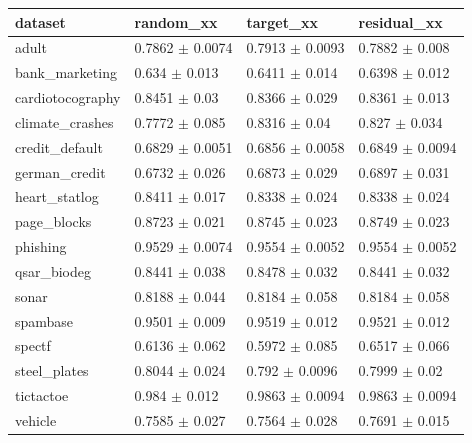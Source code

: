 \begin{tabular}{llll}
\toprule
dataset & random\_xx & target\_xx & residual\_xx \\
\midrule
adult & 0.7862 $\pm$ 0.0074 & 0.7913 $\pm$ 0.0093 & 0.7882 $\pm$ 0.008 \\
bank\_marketing & 0.634 $\pm$ 0.013 & 0.6411 $\pm$ 0.014 & 0.6398 $\pm$ 0.012 \\
cardiotocography & 0.8451 $\pm$ 0.03 & 0.8366 $\pm$ 0.029 & 0.8361 $\pm$ 0.013 \\
climate\_crashes & 0.7772 $\pm$ 0.085 & 0.8316 $\pm$ 0.04 & 0.827 $\pm$ 0.034 \\
credit\_default & 0.6829 $\pm$ 0.0051 & 0.6856 $\pm$ 0.0058 & 0.6849 $\pm$ 0.0094 \\
german\_credit & 0.6732 $\pm$ 0.026 & 0.6873 $\pm$ 0.029 & 0.6897 $\pm$ 0.031 \\
heart\_statlog & 0.8411 $\pm$ 0.017 & 0.8338 $\pm$ 0.024 & 0.8338 $\pm$ 0.024 \\
page\_blocks & 0.8723 $\pm$ 0.021 & 0.8745 $\pm$ 0.023 & 0.8749 $\pm$ 0.023 \\
phishing & 0.9529 $\pm$ 0.0074 & 0.9554 $\pm$ 0.0052 & 0.9554 $\pm$ 0.0052 \\
qsar\_biodeg & 0.8441 $\pm$ 0.038 & 0.8478 $\pm$ 0.032 & 0.8441 $\pm$ 0.032 \\
sonar & 0.8188 $\pm$ 0.044 & 0.8184 $\pm$ 0.058 & 0.8184 $\pm$ 0.058 \\
spambase & 0.9501 $\pm$ 0.009 & 0.9519 $\pm$ 0.012 & 0.9521 $\pm$ 0.012 \\
spectf & 0.6136 $\pm$ 0.062 & 0.5972 $\pm$ 0.085 & 0.6517 $\pm$ 0.066 \\
steel\_plates & 0.8044 $\pm$ 0.024 & 0.792 $\pm$ 0.0096 & 0.7999 $\pm$ 0.02 \\
tictactoe & 0.984 $\pm$ 0.012 & 0.9863 $\pm$ 0.0094 & 0.9863 $\pm$ 0.0094 \\
vehicle & 0.7585 $\pm$ 0.027 & 0.7564 $\pm$ 0.028 & 0.7691 $\pm$ 0.015 \\
\bottomrule
\end{tabular}
